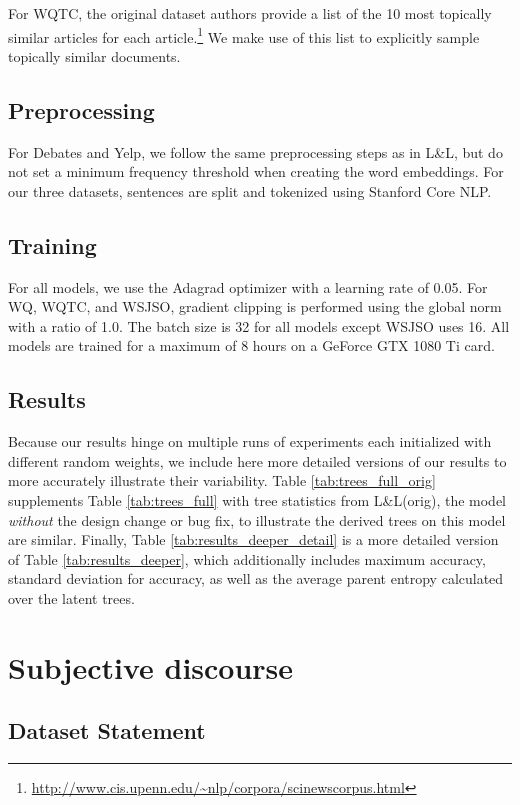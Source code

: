 For WQTC, the original dataset authors provide a list of the 10 most topically similar articles for each article.\footnote{\url{http://www.cis.upenn.edu/~nlp/corpora/scinewscorpus.html}} We make use of this list to explicitly sample topically similar documents.

\section{Preprocessing} For Debates and Yelp, we follow the same preprocessing steps as in L\&L, but do not set a minimum frequency threshold when creating the word embeddings. 
For our three datasets, sentences are split and tokenized using Stanford Core NLP.

\section{Training} For all models, we use the Adagrad optimizer with a learning rate of 0.05. For WQ, WQTC, and WSJSO, gradient clipping is performed using the global norm with a ratio of 1.0. The batch size is 32 for all models except WSJSO uses 16. All models are trained for a maximum of 8 hours on a GeForce GTX 1080 Ti card.

\section{Results}  Because our results hinge on multiple runs of experiments each initialized with different random weights, we include here more detailed versions of our results to more accurately illustrate their variability. Table \ref{tab:trees_full_orig} supplements Table \ref{tab:trees_full} with tree statistics from L\&L(orig), the model \emph{without} the design change or bug fix, to illustrate the derived trees on this model are similar. Finally, Table \ref{tab:results_deeper_detail} is a more detailed version of Table \ref{tab:results_deeper}, which additionally includes  maximum accuracy, standard deviation for accuracy, as well as the average parent entropy calculated over the latent trees. 

\chapter{Subjective discourse}
\label{app:subjective}

\section{Dataset Statement}
\label{sec:app_subjective}

